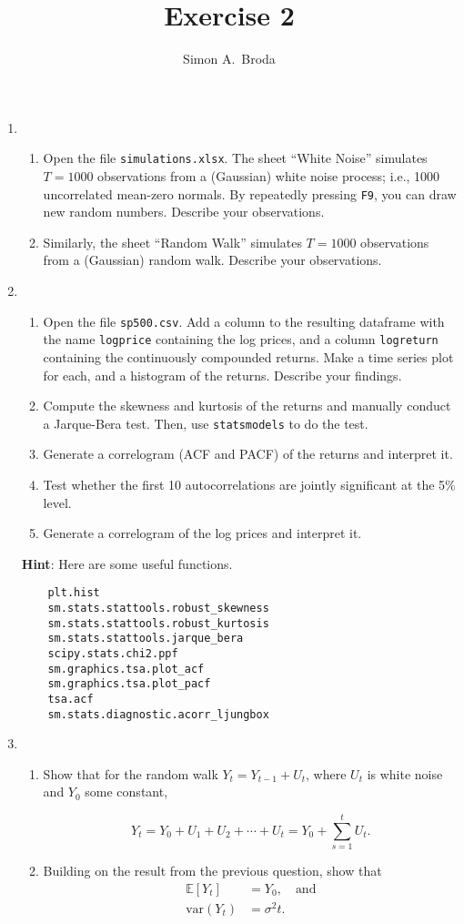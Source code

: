 \documentclass[11pt, a4paper]{article}
\newcommand{\E}{\ensuremath{{\mathbb E}}} %
\begin{document}
\title{Exercise 2}
\author{Simon A.\ Broda}
\date{}
\maketitle

\begin{enumerate}
\item
\begin{enumerate}
\item Open the file \texttt{simulations.xlsx}. The sheet ``White Noise'' simulates $T=1000$ observations from a (Gaussian) white noise process; i.e., 1000 uncorrelated mean-zero normals. By repeatedly pressing \texttt{F9}, you can draw new random numbers. Describe your observations.
\item Similarly, the sheet ``Random Walk'' simulates $T=1000$ observations from a (Gaussian) random walk. Describe your observations.
\end{enumerate}
\item
\begin{enumerate}
\item Open the file \texttt{sp500.csv}. Add a column to the resulting dataframe with the name \texttt{log\textunderscore price} containing the log prices, and a column \texttt{log\textunderscore return} containing the continuously compounded returns. Make a time series plot for each, and a histogram of the returns. Describe your findings.
\item Compute the skewness and kurtosis of the returns and manually conduct a Jarque-Bera test. Then, use \texttt{statsmodels} to do the test.
\item Generate a correlogram (ACF and PACF) of the returns and interpret it. 
\item Test whether the first 10 autocorrelations are jointly significant at the 5\% level.
\item Generate a correlogram of the log prices and interpret it.
\end{enumerate}
\textbf{Hint}: Here are some useful functions. 
\begin{verbatim}
	plt.hist
	sm.stats.stattools.robust_skewness
	sm.stats.stattools.robust_kurtosis
	sm.stats.stattools.jarque_bera
	scipy.stats.chi2.ppf
	sm.graphics.tsa.plot_acf
	sm.graphics.tsa.plot_pacf
	tsa.acf
	sm.stats.diagnostic.acorr_ljungbox
\end{verbatim}
\item
\begin{enumerate}
\item Show that for the random walk $Y_t=Y_{t-1}+U_t$, where $U_t$ is white noise and $Y_0$ some constant,

\[
Y_t=Y_0+U_1+U_2+\cdots+U_t=Y_0+\sum_{s=1}^t U_t.
\]
\item Building on the result from the previous question, show that
\begin{align*}
\E[Y_t]&=Y_0,\quad\mbox{and} \\
\mathrm{var}(Y_t)&=\sigma ^2t.
\end{align*}

\end{enumerate}
\end{enumerate}
\end{document}
